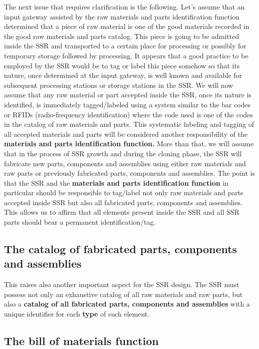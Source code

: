 \hypertarget{RefHeading3058306210128}{}The next issue that requires
clarification is the following. Let’s assume that an input gateway
assisted by the raw materials and parts identification function
determined that a piece of raw material is one of the good materials
recorded in the good raw materials and parts catalog. This piece is
going to be admitted inside the SSR and transported to a certain place
for processing or possibly for temporary storage followed by
processing. It appears that a good practice to be employed by the SSR
would be to tag or label this piece somehow so that its nature, once
determined at the input gateway, is well known and available for
subsequent processing stations or storage stations in the SSR. We will
now assume that any raw material or part accepted inside the SSR, once
its nature is identified, is immediately tagged/labeled using a system
similar to the bar codes or RFIDs (radio-frequency identification)
where the code used is one of the codes in the catalog of raw materials
and parts. This systematic labeling and tagging of all accepted
materials and parts will be considered another responsibility of the
\textbf{materials and parts identification function. }More than that,
we will assume that in the process of SSR growth and during the cloning
phase, the SSR will fabricate new parts, components and assemblies
using either raw materials and raw parts or previously fabricated
parts, components and assemblies. The point is that the SSR and the
\textbf{materials and parts identification function} in
particular should be responsible to tag/label not
only raw materials and parts accepted inside SSR but also all
fabricated parts, components and assemblies. This allows us to affirm
that all elements present inside the SSR and all SSR parts should bear
a permanent identification/tag.

\subsection[The catalog of fabricated parts, components and
assemblies]{The catalog of fabricated parts, components and assemblies}

\hypertarget{RefHeading3060306210128}{}This raises also another
important aspect for the SSR design. The SSR must possess not only an
exhaustive catalog of all raw materials and raw parts, but also a
\textbf{catalog of all fabricated parts, components and assemblies}
with a unique identifier for each \textbf{type} of such element. 

\subsection[The bill of materials function]{The bill of materials
function}

